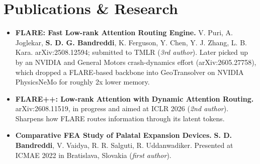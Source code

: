 \documentclass[letterpaper,10pt]{article}
\newcommand{\resumeItem}[1]{
  \item\small{{#1 \vspace{-2pt}}}
}
\newcommand{\resumeItemListStart}{\begin{itemize}[leftmargin=0.28in, itemsep=1pt, topsep=2pt]}
\newcommand{\resumeItemListEnd}{\end{itemize}\vspace{-4pt}}
\begin{document}
\section{Publications \& Research}
  \resumeItemListStart
    \resumeItem{\textbf{FLARE: Fast Low-rank Attention Routing Engine.} V. Puri, A. Joglekar, \textbf{S. D. G. Bandreddi}, K. Ferguson, Y. Chen, Y. J. Zhang, L. B. Kara. arXiv:2508.12594; submitted to TMLR (\textit{3rd author}). Later picked up by an NVIDIA and General Motors crash-dynamics effort (arXiv:2605.27758), which dropped a FLARE-based backbone into GeoTransolver on NVIDIA PhysicsNeMo for roughly 2x lower memory.}
    \resumeItem{\textbf{FLARE++: Low-rank Attention with Dynamic Attention Routing.} arXiv:2608.11519, in progress and aimed at ICLR 2026 (\textit{2nd author}). Sharpens how FLARE routes information through its latent tokens.}
    \resumeItem{\textbf{Comparative FEA Study of Palatal Expansion Devices.} \textbf{S. D. Bandreddi}, V. Vaidya, R. R. Salguti, R. Uddanwadiker. Presented at ICMAE 2022 in Bratislava, Slovakia (\textit{first author}).}
  \resumeItemListEnd

\end{document}
